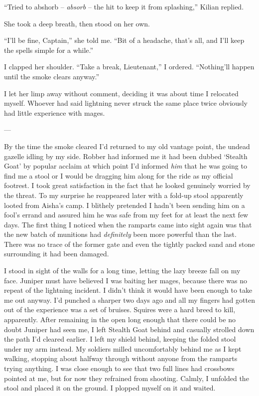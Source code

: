 \documentclass[12pt, openany]{book}
\begin{document}
“Tried to abshorb – \textit{absorb} – the hit to keep it from splashing,” Kilian replied.

She took a deep breath, then stood on her own.

“I’ll be fine, Captain,” she told me. “Bit of a headache, that’s all, and I’ll keep the spells simple for a while.”

I clapped her shoulder. “Take a break, Lieutenant,” I ordered. “Nothing’ll happen until the smoke clears anyway.”

I let her limp away without comment, deciding it was about time I relocated myself. Whoever had said lightning never struck the same place twice obviously had little experience with mages.

—

By the time the smoke cleared I’d returned to my old vantage point, the undead gazelle idling by my side. Robber had informed me it had been dubbed ‘Stealth Goat’ by popular acclaim at which point I’d informed \textit{him }that he was going to find me a stool or I would be dragging him along for the ride as my official footrest. I took great satisfaction in the fact that he looked genuinely worried by the threat. To my surprise he reappeared later with a fold-up stool apparently looted from Aisha’s camp. I blithely pretended I hadn’t been sending him on a fool’s errand and assured him he was safe from my feet for at least the next few days. The first thing I noticed when the ramparts came into sight again was that the new batch of munitions had \textit{definitely} been more powerful than the last. There was no trace of the former gate and even the tightly packed sand and stone surrounding it had been damaged.

I stood in sight of the walls for a long time, letting the lazy breeze fall on my face. Juniper must have believed I was baiting her mages, because there was no repeat of the lightning incident. I didn’t think it would have been enough to take me out anyway. I’d punched a sharper two days ago and all my fingers had gotten out of the experience was a set of bruises. Squires were a hard breed to kill, apparently. After remaining in the open long enough that there could be no doubt Juniper had seen me, I left Stealth Goat behind and casually strolled down the path I’d cleared earlier. I left my shield behind, keeping the folded stool under my arm instead. My soldiers milled uncomfortably behind me as I kept walking, stopping about halfway through without anyone from the ramparts trying anything. I was close enough to see that two full lines had crossbows pointed at me, but for now they refrained from shooting. Calmly, I unfolded the stool and placed it on the ground. I plopped myself on it and waited.
\end{document}
